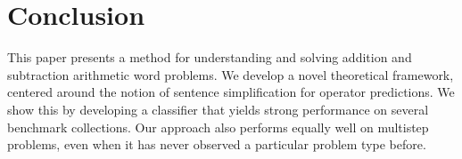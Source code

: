 \documentclass[11pt]{article}
\begin{document}
\section{Conclusion}\label{sec:conclusion}
This paper presents a method for understanding and solving addition and subtraction arithmetic word problems. We develop a novel theoretical framework, centered around the notion of sentence simplification for operator predictions. We show this by developing a classifier that yields strong performance on several benchmark collections. Our approach also performs equally well on multistep problems, even when it has never observed a particular problem type before.



\end{document}
